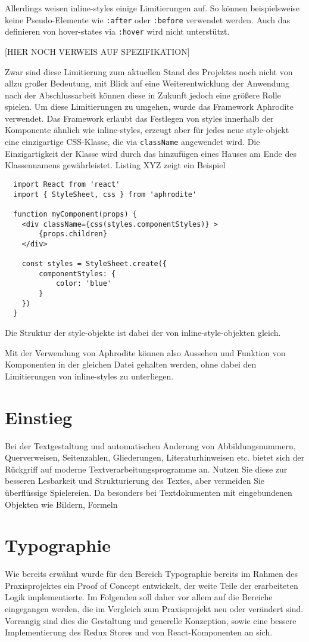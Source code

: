 Allerdings weisen inline-styles einige Limitierungen auf. So können beispielsweise keine Pseudo-Elemente wie \verb|:after| oder \verb|:before| verwendet werden. Auch das definieren von hover-states via \verb|:hover| wird nicht unterstützt.

[HIER NOCH VERWEIS AUF SPEZIFIKATION]

Zwar sind diese Limitierung zum aktuellen Stand des Projektes noch nicht von allzu großer Bedeutung, mit Blick auf eine Weiterentwicklung der Anwendung nach der Abschlussarbeit können diese in Zukunft jedoch eine größere Rolle spielen.
Um diese  Limitierungen zu umgehen, wurde das Framework Aphrodite verwendet. Das Framework erlaubt das Festlegen von styles innerhalb der Komponente ähnlich wie inline-styles, erzeugt aber für jedes neue style-objekt eine einzigartige CSS-Klasse, die via \verb|className| angewendet wird. Die Einzigartigkeit der Klasse wird durch das hinzufügen eines Hauses am Ende des Klassennamens gewährleistet.  Listing XYZ zeigt ein Beispiel

\begin{lstlisting}
  import React from 'react'
  import { StyleSheet, css } from 'aphrodite'

  function myComponent(props) {
  	<div className={css(styles.componentStyles)} >
  		{props.children}
  	</div>

  	const styles = StyleSheet.create({
  		componentStyles: {
  			color: 'blue'
  		}
  	})
  }
\end{lstlisting}

Die Struktur der style-objekte ist dabei der von inline-style-objekten gleich.

Mit der Verwendung von Aphrodite können also Aussehen und Funktion von Komponenten in der gleichen Datei gehalten werden, ohne dabei den Limitierungen von inline-styles zu unterliegen.

\section{Einstieg}
Bei der Textgestaltung und automatischen Änderung von Abbildungsnummern, Querverweisen,
Seitenzahlen, Gliederungen, Literaturhinweisen etc. bietet sich der Rückgriff
auf moderne Textverarbeitungsprogramme an. Nutzen Sie diese zur besseren Lesbarkeit
und Strukturierung des Textes, aber vermeiden Sie überflüssige Spielereien. Da
besonders bei Textdokumenten mit eingebundenen Objekten wie Bildern, Formeln

\section{Typographie}
Wie bereits erwähnt wurde für den Bereich Typographie bereits im Rahmen des Praxisprojektes ein Proof of Concept entwickelt, der weite Teile der erarbeiteten Logik implementierte.
Im Folgenden soll daher vor allem auf die Bereiche eingegangen werden, die im Vergleich zum Praxisprojekt neu oder verändert sind. Vorrangig sind dies die Gestaltung und generelle Konzeption, sowie eine bessere Implementierung des Redux Stores und von React-Komponenten an sich.

